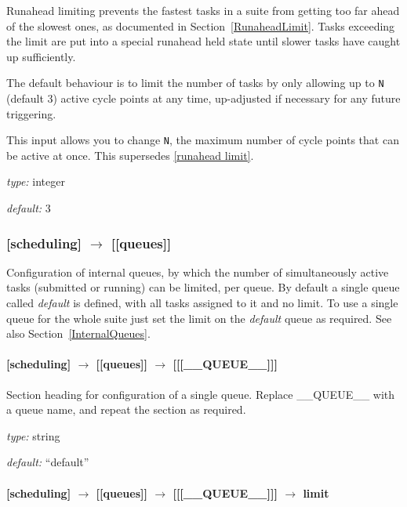 Runahead limiting prevents the fastest tasks in a suite from
getting too far ahead of the slowest ones, as documented in
Section~\ref{RunaheadLimit}. Tasks exceeding the limit are put into
a special runahead held state until slower tasks have caught up
sufficiently.

The default behaviour is to limit the number of tasks
by only allowing up to \lstinline=N= (default 3) active cycle points at
any time, up-adjusted if necessary for any future triggering.

This input allows you to change \lstinline=N=, the maximum
number of cycle points that can be active at once. This supersedes
\ref{runahead limit}.

\begin{myitemize}
    \item {\em type:} integer
    \item {\em default:} 3
\end{myitemize}


\subsubsection[{[[}queues{]]}]{[scheduling] $\rightarrow$ [[queues]]}

Configuration of internal queues, by which the number of simultaneously
active tasks (submitted or running) can be limited, per queue. By
default a single queue called {\em default} is defined, with all tasks
assigned to it and no limit. To use a single queue for the whole suite
just set the limit on the {\em default} queue as required.
See also Section~\ref{InternalQueues}.

\paragraph[{[[[}\_\_QUEUE\_\_{]]]}]{[scheduling] $\rightarrow$ [[queues]] $\rightarrow$ [[[\_\_QUEUE\_\_]]]}

Section heading for configuration of a single queue. Replace
\_\_QUEUE\_\_ with a queue name, and repeat the section as required.

\begin{myitemize}
\item {\em type:} string
\item {\em default:} ``default''
\end{myitemize}

\paragraph[limit]{[scheduling] $\rightarrow$ [[queues]] $\rightarrow$ [[[\_\_QUEUE\_\_]]] $\rightarrow$ limit}

